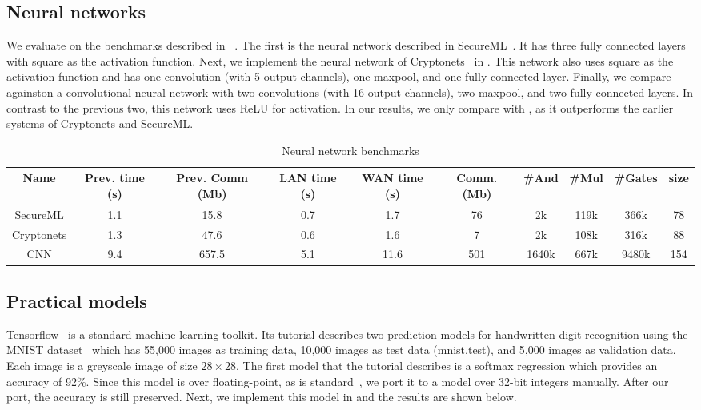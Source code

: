
\subsection{Neural networks}
We evaluate on the benchmarks described in \minion~\cite{minionn}.
The first is the neural network described in SecureML~\cite{secureml}.
It has three fully connected layers with square as the activation function.
Next, we implement the neural network of Cryptonets~\cite{cryptonets} in \tool.
This network also uses square as the activation function and has one convolution (with 5 output channels), one maxpool, and one fully connected layer.
Finally, we compare against\minion on a convolutional neural network
with two convolutions (with 16 output channels), two maxpool, and two fully connected layers.
In contrast to the previous two, this network uses ReLU for activation.
In our results, we only compare with \minion, as it outperforms the earlier systems of
Cryptonets and SecureML.

\begin{table*}
\begin{tabular}{c|c|c|c |c|c|c|c|c|c}
Name  & Prev. time (s) & Prev. Comm (Mb) & LAN time (s) & WAN time (s) & Comm. (Mb)  & \#And & \#Mul & \#Gates & size\\
\hline
SecureML   &  1.1 & 15.8 & 0.7 & 1.7  & 76   &  2k   & 119k & 366k   & 78\\
\hline
Cryptonets &  1.3 & 47.6 & 0.6 & 1.6  & 7    & 2k    & 108k & 316k & 88\\
\hline
CNN        &  9.4 & 657.5& 5.1 & 11.6 & 501  & 1640k & 667k & 9480k & 154\\
\hline
\end{tabular}

 \caption{Neural network benchmarks}
 \label{tab:nn} 
\end{table*}


\subsection{Practical models}
Tensorflow~\cite{tensorflow} is a standard machine learning toolkit.
Its tutorial describes two prediction models for handwritten digit recognition
using the MNIST dataset~\cite{mnist} which has 55,000 images as training data,
10,000 images as test data (mnist.test), and 5,000 images as validation data.
Each image is a greyscale image of size $28\times 28$.
The first model that the tutorial describes is a softmax regression
which provides an accuracy of 92\%. Since this model is over floating-point,
as is standard~\cite{secureml,minionn}, we port it to a model over 32-bit integers manually. After our port, the accuracy is still preserved.
Next, we implement this model in \tool and the results are shown below.

